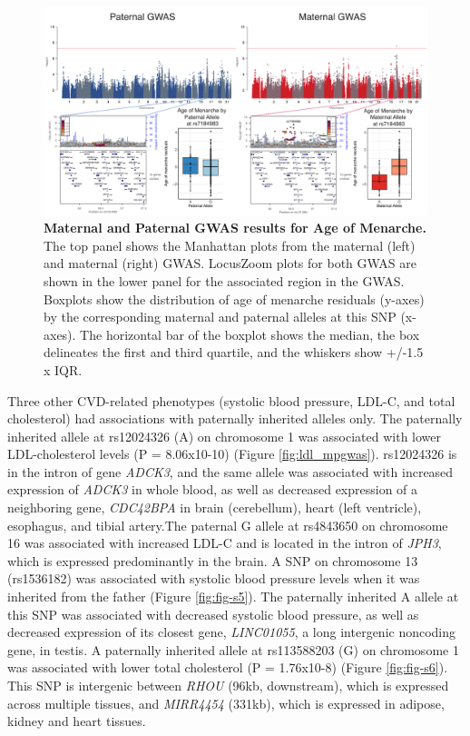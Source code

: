 \begin{figure}[!htb]
\centering \includegraphics[width=6in]{img/ch02/fig-01-menarche_matpatgwas.pdf}
\caption[Maternal and Paternal GWAS results for Age of Menarche.]{\textbf{Maternal and Paternal GWAS results for Age of Menarche.}  The top panel shows the Manhattan plots from the maternal (left) and maternal (right) GWAS. LocusZoom plots for both GWAS are shown in the lower panel for the associated region in the GWAS. Boxplots show the distribution of age of menarche residuals (y-axes) by the corresponding maternal and paternal alleles at this SNP (x-axes). The horizontal bar of the boxplot shows the median, the box delineates the first and third quartile, and the whiskers show +/-1.5 x IQR.}
\label{fig:menarche_mpgwas}
\end{figure}

Three other CVD-related phenotypes (systolic blood pressure, LDL-C, and total cholesterol) had associations with paternally inherited alleles only. The paternally inherited allele at rs12024326 (A) on chromosome 1 was associated with lower LDL-cholesterol levels (P = 8.06x10-10) (Figure \ref{fig:ldl_mpgwas}). rs12024326 is in the intron of gene \emph{ADCK3}, and the same allele was associated with increased expression of \emph{ADCK3} in whole blood, as well as decreased expression of a neighboring gene, \emph{CDC42BPA} in brain (cerebellum), heart (left ventricle), esophagus, and tibial artery\cite{Consortium2015}.The paternal G allele at rs4843650 on chromosome 16 was associated with increased LDL-C and is located in the intron of \emph{JPH3}, which is expressed predominantly in the brain\cite{Consortium2015}. A SNP on chromosome 13 (rs1536182) was associated with systolic blood pressure levels when it was inherited from the father (Figure \ref{fig:fig-s5}). The paternally inherited A allele at this SNP was associated with decreased systolic blood pressure, as well as decreased expression of its closest gene, \emph{LINC01055}, a long intergenic noncoding gene, in testis\cite{Consortium2015}. A paternally inherited allele at rs113588203 (G) on chromosome 1 was associated with lower total cholesterol (P = 1.76x10-8) (Figure \ref{fig:fig-s6}). This SNP is intergenic between \emph{RHOU} (96kb, downstream), which is expressed across multiple tissues, and \emph{MIRR4454} (331kb), which is expressed in adipose, kidney and heart tissues\cite{Consortium2015}. 


